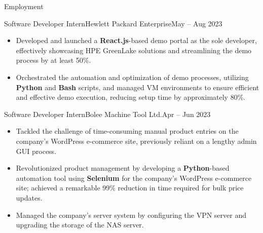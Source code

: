 \documentclass[]{mcdowellcv}
\begin{document}
\begin{cvsection}{Employment}
\begin{cvsubsection}{Software Developer Intern}{Hewlett Packard Enterprise}{May -- Aug 2023}
\begin{itemize}
				\item Developed and launched a \textbf{React.js}-based demo portal as the sole developer, effectively showcasing HPE GreenLake solutions and streamlining the demo process by at least 50\%.
				\item Orchestrated the automation and optimization of demo processes, utilizing \textbf{Python} and \textbf{Bash} scripts, and managed VM environments to ensure efficient and effective demo execution, reducing setup time by approximately 80\%.
			\end{itemize}
		\end{cvsubsection}
		\begin{cvsubsection}{Software Developer Intern}{Bolee Machine Tool Ltd.}{Apr -- Jun 2023}	
			\begin{itemize}
				\item Tackled the challenge of time-consuming manual product entries on the company's WordPress e-commerce site, previously reliant on a lengthy admin GUI process.
				\item Revolutionized product management by developing a \textbf{Python}-based automation tool using \textbf{Selenium} for the company's WordPress e-commerce site; achieved a remarkable 99\% reduction in time required for bulk price updates.
				\item Managed the company’s server system by configuring the VPN server and upgrading the storage of the NAS server.
			\end{itemize}
		\end{cvsubsection}
	\end{cvsection}
	
\end{document}
